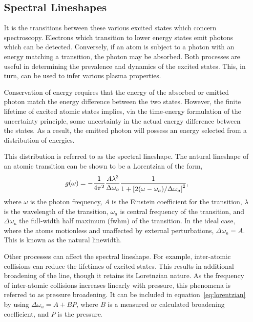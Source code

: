 \subsection{Spectral Lineshapes}

It is the transitions between these various excited states which concern
spectroscopy. Electrons which transition to lower energy states emit photons
which can be detected. Conversely, if an atom is subject to a photon with an
energy matching a transition, the photon may be absorbed. Both processes are
useful in determining the prevalence and dynamics of the excited states. This,
in turn, can be used to infer various plasma properties.

Conservation of energy requires that the energy of the absorbed or emitted
photon match the energy difference between the two states. However, the finite
lifetime of excited atomic states implies, via the time-energy formulation of
the uncertainty principle, some uncertainty in the actual energy difference
between the states. As a result, the emitted photon will possess an energy
selected from a distribution of energies.

This distribution is referred to as the spectral lineshape. The natural
lineshape of an atomic transition can be shown \cite{Siegman1986} to be a
Lorentzian of the form,
\begin{equation}
  g(\omega) = -\frac{1}{4\pi^2}\frac{A\lambda^3}{\Delta \omega_a}
  \frac{1}{1 + \left[2(\omega-\omega_a)/\Delta \omega_a\right]^2},
  \label{eq:lorentzian}
\end{equation}
where $\omega$ is the photon frequency, $A$ is the Einstein coefficient for the
transition, $\lambda$ is the wavelength of the transition, $\omega_a$ is central
frequency of the transition, and $\Delta\omega_a$ the full-width half maximum
(\acs{fwhm}) of the transition. In the ideal case, where the atoms motionless
and unaffected by external perturbations, $\Delta\omega_a = A$. This is known as
the natural linewidth.

Other processes can affect the spectral lineshape. For example, inter-atomic
collisions can reduce the lifetimes of excited states. This results in
additional broadening of the line, though it retains its Loretnzian nature. As
the frequency of inter-atomic collisions increases linearly with pressure, this
phenomena is referred to as pressure broadening. It can be included in
equation~\ref{eq:lorentzian} by using $\Delta\omega_a = A + BP$, where $B$ is a
measured or calculated broadening coefficient, and $P$ is the pressure.

